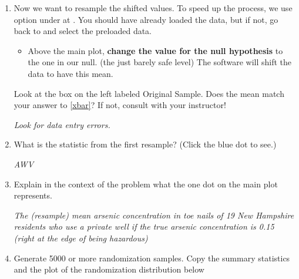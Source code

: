 \begin{enumerate}
\begin{key}
  {\it 0.15, because this is the null value. }
\end{key}



\item Now we want to resample the shifted values. To speed up the
  process, we use  option under  at
  \webAppURLFrst . You should have already loaded the data, but if
not, go back to  and select the preloaded
 data.

  \begin{itemize}
    \item Above the main plot, {\bf change the value for the null
      hypothesis} to the one in our null.  (the just barely safe level)
      The software will shift the data to have this mean.
   \end{itemize}

    Look at the box on the left labeled {\sf Original Sample}.
       Does the mean match your answer to \ref{xbar}?  If not, consult
       with your instructor! 
\begin{students}
  \vspace{1cm}
\end{students}

\begin{key}
  {\it Look for data entry errors. }
\end{key}

\item   What is the statistic from the first  resample? (Click the
  blue dot  to see.)
\begin{students}
  \vspace{1cm}
\end{students}

\begin{key}
  {\it AWV}
\end{key}



\item Explain in the context of the problem what the one dot on the
  main plot represents. 
\begin{students}
  \vspace{1cm}
\end{students}

\begin{key}
  {\it The (resample) mean arsenic concentration in toe nails of 19
    New Hampshire residents who use a private well if the true arsenic
    concentration is 0.15 (right at the edge of being  hazardous) }
\end{key}
\item Generate 5000 or more randomization samples.  Copy the summary statistics and
the plot of the randomization distribution below
\begin{students}
  \vspace{4cm}
\end{students}


\end{enumerate}
